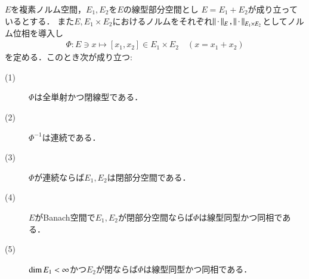 	\begin{screen}
		\begin{thm}
			
		\end{thm}
	\end{screen}
	
	\begin{screen}
		\begin{thm}[Fredholmの交代定理]
			
		\end{thm}
	\end{screen}
	
	\begin{screen}
		\begin{lem}
			$E$を複素ノルム空間，$E_1,E_2$を$E$の線型部分空間とし
			$E = E_1 + E_2$が成り立っているとする\footnotemark．
			また$E,E_1 \times E_2$におけるノルムをそれぞれ$\left\|\, \cdot\, \right\|_{E},\left\|\, \cdot\, \right\|_{E_1 \times E_2}$としてノルム位相を導入し
			\begin{align}
				\Phi:E \ni x \longmapsto [x_1,x_2] \in E_1 \times E_2
				\quad (x = x_1 + x_2)
			\end{align}
			を定める．このとき次が成り立つ:
			\begin{description}
				\item[(1)] $\Phi$は全単射かつ閉線型である．
				\item[(2)] $\Phi^{-1}$は連続である．
				\item[(3)] $\Phi$が連続ならば$E_1,E_2$は閉部分空間である．
				\item[(4)] $E$がBanach空間で$E_1,E_2$が閉部分空間ならば$\Phi$は線型同型かつ同相である．
				\item[(5)] $\operatorname{dim} E_1 < \infty$かつ$E_2$が閉ならば$\Phi$は線型同型かつ同相である．
			\end{description}
		\end{lem}
	\end{screen}
	
	
